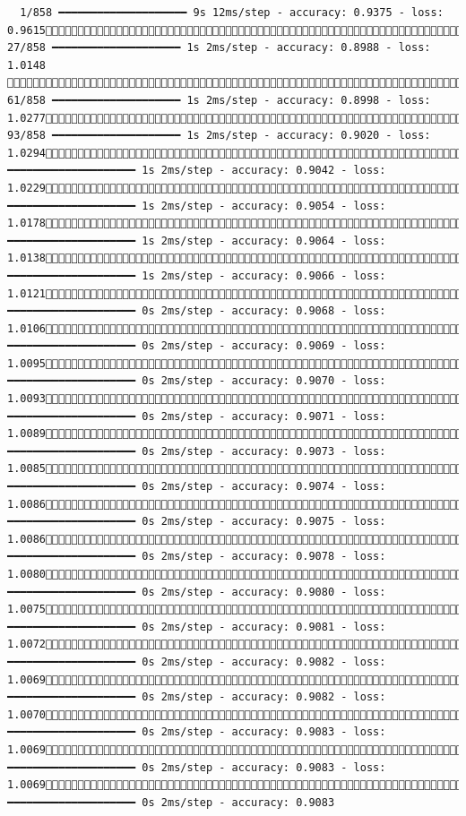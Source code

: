 \documentclass[
  letterpaper,
  DIV=11,
  numbers=noendperiod]{scrartcl}
\begin{document}
\begin{verbatim}
  1/858 ━━━━━━━━━━━━━━━━━━━━ 9s 12ms/step - accuracy: 0.9375 - loss: 0.9615 27/858 ━━━━━━━━━━━━━━━━━━━━ 1s 2ms/step - accuracy: 0.8988 - loss: 1.0148  61/858 ━━━━━━━━━━━━━━━━━━━━ 1s 2ms/step - accuracy: 0.8998 - loss: 1.0277 93/858 ━━━━━━━━━━━━━━━━━━━━ 1s 2ms/step - accuracy: 0.9020 - loss: 1.0294123/858 ━━━━━━━━━━━━━━━━━━━━ 1s 2ms/step - accuracy: 0.9042 - loss: 1.0229156/858 ━━━━━━━━━━━━━━━━━━━━ 1s 2ms/step - accuracy: 0.9054 - loss: 1.0178190/858 ━━━━━━━━━━━━━━━━━━━━ 1s 2ms/step - accuracy: 0.9064 - loss: 1.0138225/858 ━━━━━━━━━━━━━━━━━━━━ 1s 2ms/step - accuracy: 0.9066 - loss: 1.0121256/858 ━━━━━━━━━━━━━━━━━━━━ 0s 2ms/step - accuracy: 0.9068 - loss: 1.0106283/858 ━━━━━━━━━━━━━━━━━━━━ 0s 2ms/step - accuracy: 0.9069 - loss: 1.0095302/858 ━━━━━━━━━━━━━━━━━━━━ 0s 2ms/step - accuracy: 0.9070 - loss: 1.0093323/858 ━━━━━━━━━━━━━━━━━━━━ 0s 2ms/step - accuracy: 0.9071 - loss: 1.0089347/858 ━━━━━━━━━━━━━━━━━━━━ 0s 2ms/step - accuracy: 0.9073 - loss: 1.0085376/858 ━━━━━━━━━━━━━━━━━━━━ 0s 2ms/step - accuracy: 0.9074 - loss: 1.0086402/858 ━━━━━━━━━━━━━━━━━━━━ 0s 2ms/step - accuracy: 0.9075 - loss: 1.0086435/858 ━━━━━━━━━━━━━━━━━━━━ 0s 2ms/step - accuracy: 0.9078 - loss: 1.0080468/858 ━━━━━━━━━━━━━━━━━━━━ 0s 2ms/step - accuracy: 0.9080 - loss: 1.0075501/858 ━━━━━━━━━━━━━━━━━━━━ 0s 2ms/step - accuracy: 0.9081 - loss: 1.0072536/858 ━━━━━━━━━━━━━━━━━━━━ 0s 2ms/step - accuracy: 0.9082 - loss: 1.0069570/858 ━━━━━━━━━━━━━━━━━━━━ 0s 2ms/step - accuracy: 0.9082 - loss: 1.0070600/858 ━━━━━━━━━━━━━━━━━━━━ 0s 2ms/step - accuracy: 0.9083 - loss: 1.0069630/858 ━━━━━━━━━━━━━━━━━━━━ 0s 2ms/step - accuracy: 0.9083 - loss: 1.0069662/858 ━━━━━━━━━━━━━━━━━━━━ 0s 2ms/step - accuracy: 0.9083 
\end{verbatim}
\end{document}
